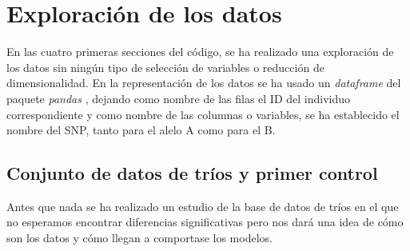 \section{Exploración de los datos}
En las cuatro primeras secciones del código, se ha realizado una exploración de los datos sin ningún tipo de selección de variables o reducción de dimensionalidad.
En la representación de los datos se ha usado un \textit{dataframe} del paquete \textit{pandas} \cite{mckinney-proc-scipy-2010}, dejando como nombre de las filas el ID del individuo correspondiente y como nombre de las columnas o variables, se ha establecido el nombre del SNP, tanto para el alelo A como para el B.
\subsection{Conjunto de datos de tríos y primer control}
Antes que nada se ha realizado un estudio de la base de datos de tríos en el que no esperamos encontrar diferencias significativas pero nos dará una idea de cómo son los datos y cómo llegan a comportase los modelos.

